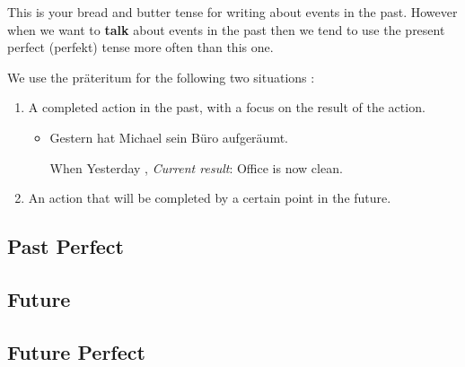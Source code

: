 \documentclass[a4paper,12pt]{article}
\begin{document}
\begin{adjustwidth}{2em}{0pt}
This is your bread and butter tense for writing about events in the past.
However when we want to \textbf{talk} about events in the past then we tend to
use the present perfect (perfekt) tense more often than this one.

\vspace{0.25cm}


We use the präteritum for the following two situations :

\begin{enumerate}
	\item A completed action in the past, with a focus on the result of the
		action.
	\begin{itemize}
		\item Gestern hat Michael sein Büro aufgeräumt.

	\vspace{0.25cm}

		When Yesterday ,
		\vspace{0.25cm}
		\textit {Current result}: Office is now clean.
	\end{itemize}
	\item An action that will be completed by a certain point in the future.
\end{enumerate}
\end{adjustwidth}

\subsection{\bf{Past Perfect}}
\begin{adjustwidth}{2em}{0pt}
\label{sec:past_perfect}



\end{adjustwidth}

\subsection{\bf{Future}}
\begin{adjustwidth}{2em}{0pt}
\label{sec:future}



\end{adjustwidth}

\subsection{\bf{Future Perfect}}
\begin{adjustwidth}{2em}{0pt}
\label{sec:future_perfect}



\end{adjustwidth}
\end{document}
